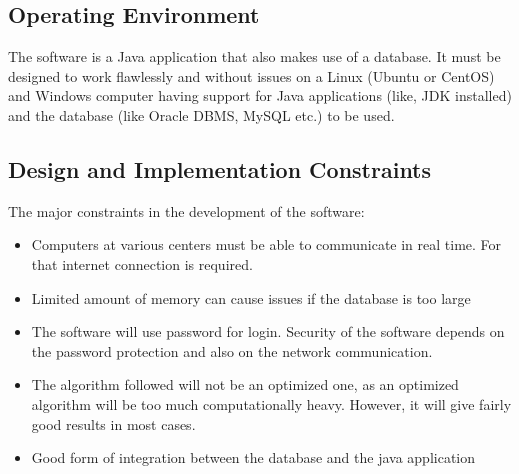 \documentclass[english,openany,12pt,a4paper,dvipsnames]{book}
\begin{document}
        \subsection{Operating Environment}
        The software is a Java application that also makes use of a database. It must be designed to work
        flawlessly and without issues on a Linux (Ubuntu or CentOS) and Windows computer having
        support for Java applications (like, JDK installed) and the database (like Oracle DBMS, MySQL
        etc.) to be used.
        \subsection{Design and Implementation Constraints}
        The major constraints in the development of the software:
                \begin{itemize}
                  \item Computers at various centers must be able to communicate in real time. For that internet
                connection is required.
                  \item Limited amount of memory can cause issues if the database is too large
                  \item The software will use password for login. Security of the software depends on the password
                protection and also on the network communication.
                  \item The algorithm followed will not be an optimized one, as an optimized algorithm will be too
                much computationally heavy. However, it will give fairly good results in most cases.
                  \item Good form of integration between the database and the java application
                \end{itemize}
\end{document}
